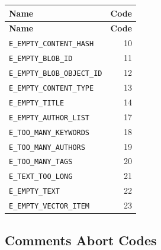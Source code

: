 \documentclass[11pt]{article}
\newcommand{\code}[1]{\texttt{#1}}
\begin{document}
\begin{longtable}{lr}
\toprule
\textbf{Name} & \textbf{Code} \\
\midrule
\endfirsthead
\toprule
\textbf{Name} & \textbf{Code} \\
\midrule
\endhead
\code{E\_EMPTY\_CONTENT\_HASH} & 10 \\
\code{E\_EMPTY\_BLOB\_ID} & 11 \\
\code{E\_EMPTY\_BLOB\_OBJECT\_ID} & 12 \\
\code{E\_EMPTY\_CONTENT\_TYPE} & 13 \\
\code{E\_EMPTY\_TITLE} & 14 \\
\code{E\_EMPTY\_AUTHOR\_LIST} & 17 \\
\code{E\_TOO\_MANY\_KEYWORDS} & 18 \\
\code{E\_TOO\_MANY\_AUTHORS} & 19 \\
\code{E\_TOO\_MANY\_TAGS} & 20 \\
\code{E\_TEXT\_TOO\_LONG} & 21 \\
\code{E\_EMPTY\_TEXT} & 22 \\
\code{E\_EMPTY\_VECTOR\_ITEM} & 23 \\
\bottomrule
\end{longtable}

\subsection{Comments Abort Codes}
\end{document}

